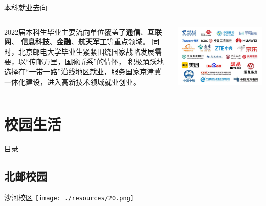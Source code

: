 \documentclass[aspectratio=169, utf8, fontset=windows]{beamer}
\begin{document}
\begin{frame}{本科就业去向}
    \begin{columns}
        \setlength{\parindent}{2em}

        2022届本科生毕业主要流向单位覆盖了\textcolor{Fore}{\textbf{通信}}、\textcolor{Fore}{\textbf{互联网}}、
        \textcolor{Fore}{\textbf{信息科技}}、\textcolor{Fore}{\textbf{金融}}、\textcolor{Fore}{\textbf{航天军工}}等重点领域。
        同时，北京邮电大学毕业生紧紧围绕国家战略发展需要，以“传邮万里，国脉所系”的情怀，
        积极踊跃地选择在“一带一路”沿线地区就业，服务国家京津冀一体化建设，进入高新技术领域就业创业。

        \includegraphics[width=\textwidth]{./resources/19.jpg}
    \end{columns}
\end{frame}

\section{校园生活}

\begin{frame}{目录}
    \begin{multicols}{2}
        \tableofcontents[currentsection]
    \end{multicols}
\end{frame}

\subsection*{北邮校园}

\begin{frame}{沙河校区}
    \centering
    \texttt{[image: ./resources/20.png]}
\end{frame}
\end{document}
